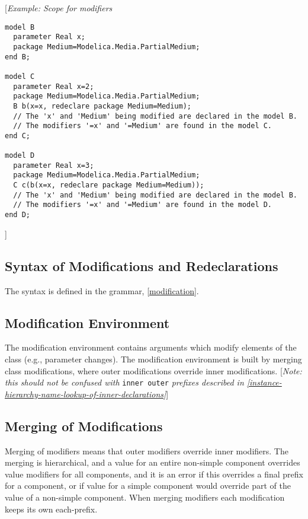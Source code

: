 {[}\emph{Example: Scope for modifiers}
\begin{lstlisting}[language=modelica]
model B
  parameter Real x;
  package Medium=Modelica.Media.PartialMedium;
end B;

model C
  parameter Real x=2;
  package Medium=Modelica.Media.PartialMedium;
  B b(x=x, redeclare package Medium=Medium);
  // The 'x' and 'Medium' being modified are declared in the model B.
  // The modifiers '=x' and '=Medium' are found in the model C.
end C;

model D
  parameter Real x=3;
  package Medium=Modelica.Media.PartialMedium;
  C c(b(x=x, redeclare package Medium=Medium));
  // The 'x' and 'Medium' being modified are declared in the model B.
  // The modifiers '=x' and '=Medium' are found in the model D.
end D;
\end{lstlisting}

{]}

\subsection{Syntax of Modifications and Redeclarations}

The syntax is defined in the grammar, \autoref{modification}.

\subsection{Modification Environment}

The modification environment contains arguments which modify elements of
the class (e.g., parameter changes). The modification environment is
built by merging class modifications, where outer modifications override
inner modifications. {[}\emph{Note: this should not be confused with}
\lstinline[basicstyle=\ttfamily]!inner outer! \emph{prefixes described in \autoref{instance-hierarchy-name-lookup-of-inner-declarations}}{]}

\subsection{Merging of Modifications}

Merging of modifiers means that outer modifiers override inner
modifiers. The merging is hierarchical, and a value for an entire
non-simple component overrides value modifiers for all components, and
it is an error if this overrides a final prefix for a component, or if
value for a simple component would override part of the value of a
non-simple component. When merging modifiers each modification keeps its
own each-prefix.

